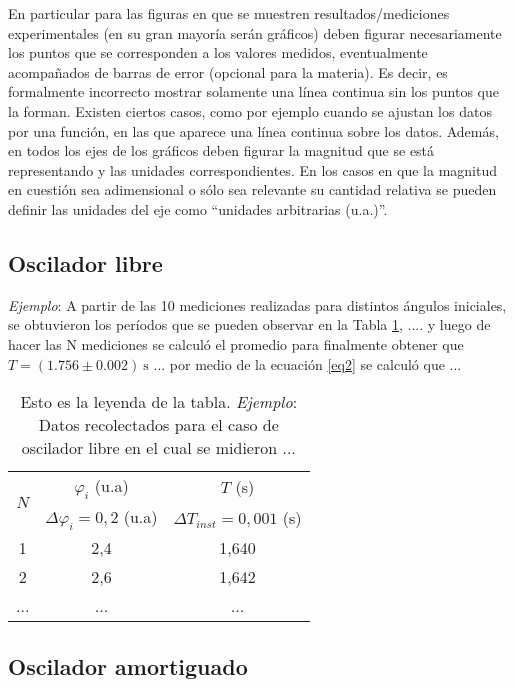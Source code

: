 \documentclass[12pt,a4paper]{article}
\begin{document}
En particular para las figuras en que se muestren resultados/mediciones experimentales (en su gran mayoría serán gráficos) deben figurar necesariamente los puntos que se corresponden a los valores medidos, eventualmente acompañados de barras de error (opcional para la materia). Es decir, es formalmente incorrecto mostrar solamente una línea continua sin los puntos que la forman. Existen ciertos casos, como por ejemplo cuando se ajustan los datos por una función, en las que aparece una línea continua sobre los datos. Además, en todos los ejes de los gráficos deben figurar la magnitud que se está representando y las unidades correspondientes. En los casos en que la magnitud en cuestión sea adimensional o sólo sea relevante su cantidad relativa se pueden definir las unidades del eje como “unidades arbitrarias (u.a.)''.


\subsection{Oscilador libre}

\textit{Ejemplo}: A partir de las 10 mediciones realizadas para distintos ángulos iniciales, se obtuvieron los períodos que se pueden observar en la Tabla \ref{tabla1}, .... y luego de hacer las N mediciones se calculó el promedio para finalmente obtener que $T = (1.756 \pm 0.002) \ \mathrm{s}$ ... por medio de la ecuación \ref{eq2} se calculó que ...


\begin{table}[ht]
    \centering
    \begin{tabular}{|c|c|c|} 
    \hline
    \multirow{2}{0.4cm}{$N$} & $\varphi_i$ (u.a) & $T$ (s) \\ 
     & $ \Delta\varphi_i=0,2$ (u.a) & $\Delta T_{inst}=0,001$ (s) \\  \hline
         1  &   2,4  &   1,640 \\
         2  &   2,6  &   1,642 \\ 
        ... &   ...  &   ...   \\ \hline
    \end{tabular}
    \caption{Esto es la leyenda de la tabla. \textit{Ejemplo}: Datos recolectados para el caso de oscilador libre en el cual se midieron ...}
    \label{tabla1}
\end{table}



\subsection{Oscilador amortiguado}
\end{document}
